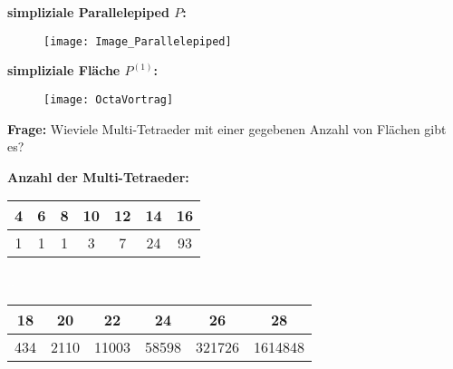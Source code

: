 \documentclass{beamer}
\begin{document}
\begin{frame}
\textbf{simpliziale Parallelepiped $P$:}
\begin{figure}[H]
\begin{center}
\texttt{[image: Image\_Parallelepiped]}
\end{center}
\end{figure}
\end{frame}
\begin{frame}
\textbf{simpliziale Fläche $P^{(1)}$:}
\begin{figure}[H]
\begin{center}
\texttt{[image: OctaVortrag]}
\end{center}
\end{figure}
\end{frame}

\begin{frame}
\textbf{Frage:} Wieviele Multi-Tetraeder mit einer gegebenen Anzahl von Flächen gibt es?
\end{frame}
\begin{frame}
\textbf{Anzahl der Multi-Tetraeder:}
\begin{center}
\begin{tabular}[h]{|c|c|c|c|c|c|c|}
\hline
\textbf{ 4} &  \textbf{6}& \textbf{8} &\textbf{ 10} &\textbf{ 12} & \textbf{14}&\textbf{16}\\
\hline
 1& 1& 1& 3& 7& 24& 93\\
\hline
\end{tabular}
\end{center}
\textcolor{white}{..}\\
\begin{center}
\begin{tabular}[h]{|c|c|c|c|c|c|}
\hline
\textbf{18}&\textbf{20}&\textbf{22}&\textbf{24}&\textbf{26}&\textbf{28}\\
\hline
 434& 2110& 11003& 58598& 321726& 1614848
 \\
 \hline
\end{tabular}
\end{center}
\end{frame}
\end{document}
